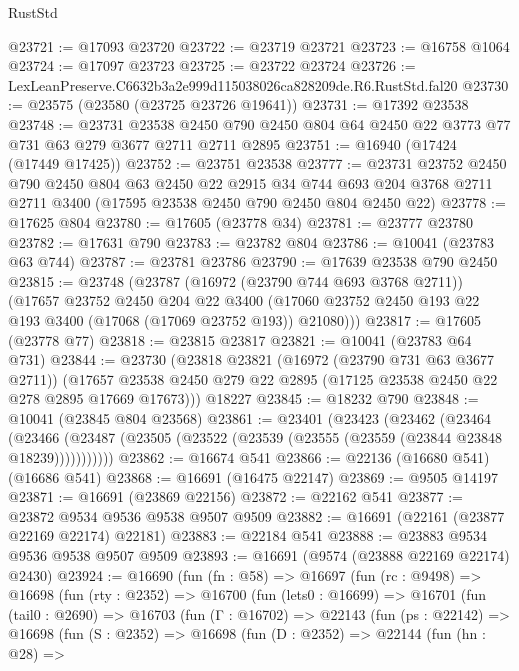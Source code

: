 \begin{lexlean}{RustStd}
\begin{coremodule}
@23721 := @17093 @23720
@23722 := @23719 @23721
@23723 := @16758 @1064
@23724 := @17097 @23723
@23725 := @23722 @23724
@23726 := LexLeanPreserve.C6632b3a2e999d115038026ca828209de.R6.RustStd.fal20
@23730 := @23575 (@23580 (@23725 @23726 @19641))
@23731 := @17392 @23538
@23748 := @23731
    @23538
    @2450
    @790
    @2450
    @804
    @64
    @2450
    @22
    @3773
    @77
    @731
    @63
    @279
    @3677
    @2711
    @2711
    @2895
@23751 := @16940 (@17424 (@17449 @17425))
@23752 := @23751 @23538
@23777 := @23731
    @23752
    @2450
    @790
    @2450
    @804
    @63
    @2450
    @22
    @2915
    @34
    @744
    @693
    @204
    @3768
    @2711
    @2711
    @3400
    (@17595 @23538 @2450 @790 @2450 @804 @2450 @22)
@23778 := @17625 @804
@23780 := @17605 (@23778 @34)
@23781 := @23777 @23780
@23782 := @17631 @790
@23783 := @23782 @804
@23786 := @10041 (@23783 @63 @744)
@23787 := @23781 @23786
@23790 := @17639 @23538 @790 @2450
@23815 := @23748
    (@23787
      (@16972 (@23790 @744 @693 @3768 @2711))
      (@17657
        @23752
        @2450
        @204
        @22
        @3400
        (@17060 @23752 @2450 @193 @22 @193 @3400 (@17068 (@17069 @23752 @193)) @21080)))
@23817 := @17605 (@23778 @77)
@23818 := @23815 @23817
@23821 := @10041 (@23783 @64 @731)
@23844 := @23730
    (@23818
      @23821
      (@16972 (@23790 @731 @63 @3677 @2711))
      (@17657 @23538 @2450 @279 @22 @2895 (@17125 @23538 @2450 @22 @278 @2895 @17669 @17673)))
    @18227
@23845 := @18232 @790
@23848 := @10041 (@23845 @804 @23568)
@23861 := @23401
    (@23423
      (@23462
        (@23464
          (@23466 (@23487 (@23505 (@23522 (@23539 (@23555 (@23559 (@23844 @23848 @18239)))))))))))
@23862 := @16674 @541
@23866 := @22136 (@16680 @541) (@16686 @541)
@23868 := @16691 (@16475 @22147)
@23869 := @9505 @14197
@23871 := @16691 (@23869 @22156)
@23872 := @22162 @541
@23877 := @23872 @9534 @9536 @9538 @9507 @9509
@23882 := @16691 (@22161 (@23877 @22169 @22174) @22181)
@23883 := @22184 @541
@23888 := @23883 @9534 @9536 @9538 @9507 @9509
@23893 := @16691 (@9574 (@23888 @22169 @22174) @2430)
@23924 := @16690
    (fun (fn : @58) =>
    @16697
      (fun (rc : @9498) =>
      @16698
        (fun (rty : @2352) =>
        @16700
          (fun (lets0 : @16699) =>
          @16701
            (fun (tail0 : @2690) =>
            @16703
              (fun (Γ : @16702) =>
              @22143
                (fun (ps : @22142) =>
                @16698
                  (fun (S : @2352) =>
                  @16698
                    (fun (D : @2352) =>
                    @22144
                      (fun (hn : @28) =>

\end{coremodule}
\end{lexlean}

